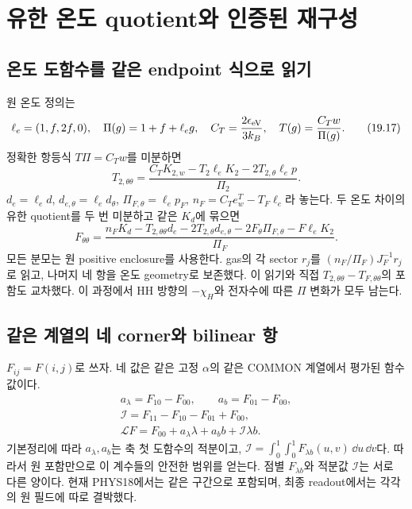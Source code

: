 \section{유한 온도 quotient와 인증된 재구성}
\subsection{온도 도함수를 같은 endpoint 식으로 읽기}
원 온도 정의는
\[
\ell_e=(1,f,2f,0),\quad \Pi(g)=1+f+\ell_eg,\quad
C_T=\frac{2\epsilon_{\rm eV}}{3k_B},\quad
T(g)=\frac{C_Tw}{\Pi(g)}.
\tag{19.17}
\]
정확한 항등식 $T\Pi=C_Tw$를 미분하면
\[
T_{2,\theta\theta}
=\frac{C_TK_{2,w}-T_2\ell_eK_2-2T_{2,\theta}\ell_ep}{\Pi_2}.
\tag{19.18}
\]
$d_e=\ell_ed$, $d_{e,\theta}=\ell_ed_\theta$,
$\Pi_{F,\theta}=\ell_ep_F$,
$n_F=C_Te_w^T-T_F\ell_e$라 놓는다.
두 온도 차이의 유한 quotient를 두 번 미분하고
같은 $K_d$에 묶으면
\[
\boxed{
F_{\theta\theta}
=\frac{
n_FK_d
-T_{2,\theta\theta}d_e
-2T_{2,\theta}d_{e,\theta}
-2F_\theta\Pi_{F,\theta}
-F\ell_eK_2}{\Pi_F}.}
\tag{19.19}
\]
모든 분모는 원 positive enclosure를 사용한다.
gas의 각 sector $r_j$를 $(n_F/\Pi_F)J_F^{-1}r_j$로 읽고,
나머지 네 항을 온도 geometry로 보존했다.
이 읽기와 직접 $T_{2,\theta\theta}-T_{F,\theta\theta}$의 포함도 교차했다.
이 과정에서 HH 방향의 $-\chi_H$와 전자수에 따른 $\Pi$ 변화가 모두 남는다.

\subsection{같은 계열의 네 corner와 bilinear 항}
$F_{ij}=F(i,j)$로 쓰자. 네 값은 같은 고정 $\alpha$의
같은 COMMON 계열에서 평가된 함수값이다.
\[
\begin{gathered}
a_\lambda=F_{10}-F_{00},\qquad a_b=F_{01}-F_{00},\\
\mathcal I=F_{11}-F_{10}-F_{01}+F_{00},\\
\mathcal LF=F_{00}+a_\lambda\lambda+a_bb+\mathcal I\lambda b.
\end{gathered}
\tag{19.20}
\]
기본정리에 따라 $a_\lambda,a_b$는 축 첫 도함수의 적분이고,
$\mathcal I=\int_0^1\int_0^1F_{\lambda b}(u,v)\,\dd u\,\dd v$다.
따라서 원 포함만으로 이 계수들의 안전한 범위를 얻는다.
점별 $F_{\lambda b}$와 적분값 $\mathcal I$는 서로 다른 양이다.
현재 PHYS18에서는 같은 구간으로 포함되며, 최종 readout에서는 각각의 원 필드에 따로 결박했다.

